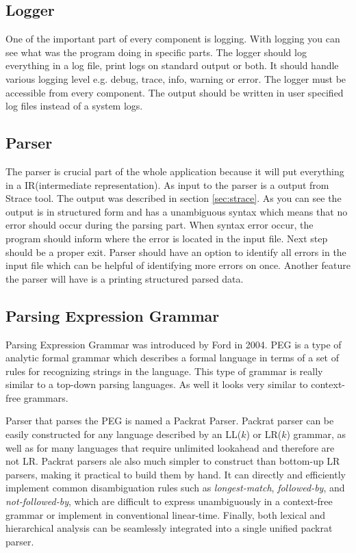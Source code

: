 \subsection{Logger}
One of the important part of every component is logging.
With logging you can see what was the program doing in specific parts.
The logger should log everything in a log file, print logs on standard output or both.
It should handle various logging level e.g. debug, trace, info, warning or error.
The logger must be accessible from every component.
The output should be written in user specified log files instead of a system logs.


\subsection{Parser}
The parser is crucial part of the whole application because it will put everything in a IR(intermediate representation).
As input to the parser is a output from Strace tool.
The output was described in section \ref{sec:strace}.
As you can see the output is in structured form and has a unambiguous syntax which means that no error should occur during the parsing part.
When syntax error occur, the program should inform where the error is located in the input file.
Next step should be a proper exit.
Parser should have an option to identify all errors in the input file which can be helpful of identifying more errors on once.
Another feature the parser will have is a printing structured parsed data.

\subsection{Parsing Expression Grammar}
Parsing Expression Grammar was introduced by Ford in 2004.
PEG is a type of analytic formal grammar which describes a formal language in terms of a set of rules for recognizing strings in the language.
This type of grammar is really similar to a top-down parsing languages.
As well it looks very similar to context-free grammars.

Parser that parses the PEG is named a Packrat Parser.
Packrat parser can be easily constructed for any language described by an LL($k$) or LR($k$) grammar, as well as for many languages that require unlimited lookahead and therefore are not LR.
Packrat parsers ale also much simpler to construct than bottom-up LR parsers, making it practical to build them by hand.
It can directly and efficiently implement common disambiguation rules such as \textit{longest-match}, \textit{followed-by}, and \textit{not-followed-by}, which are difficult to express unambiguously in a context-free grammar or implement in conventional linear-time.
Finally, both lexical and hierarchical analysis can be seamlessly integrated into a single unified packrat parser.

